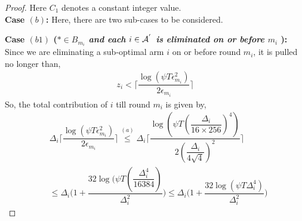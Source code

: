 \begin{proof}
Here $C_1$ denotes a constant integer value.\\


\textbf{Case $(b)$:} Here, there are two sub-cases to be considered.

\noindent
\textbf{Case $(b1)$ (\textit{${*}\in B_{m_{i}}$ and each ${i}\in \mathcal{A}^{'}$ is  eliminated on or before $m_{i}$ }): } Since we are eliminating a sub-optimal arm ${i}$ on or before round $m_{i}$, it is pulled no longer than, 
 \begin{align*}
 z_{i} < \bigg\lceil\dfrac{\log{(\psi T\epsilon_{m_{i}}^{2})}}{2\epsilon_{m_{i}}}\bigg\rceil
 \end{align*}
So, the total contribution of ${i}$  till round $m_{i}$ is given by, 
\begin{align*}
&\Delta_{i}\bigg\lceil\dfrac{\log{(\psi T\epsilon_{m_{i}}^{2})}}{2\epsilon_{m_{i}}}\bigg\rceil
\overset{(a)}{\leq}    \Delta_{i}\bigg\lceil\dfrac{\log{(\psi T(\dfrac{\Delta_{i}}{16 \times 256})^{4})}}{2(\dfrac{\Delta_{i}}{4\sqrt{4}})^{2}}\bigg\rceil \\
&\leq   \Delta_{i}\bigg(1+\dfrac{32\log{(\psi T(\dfrac{\Delta_{i}^{4}}{16384})}}{\Delta_{i}^{2}}\bigg)
\leq \Delta_{i}\bigg(1+\dfrac{32\log{(\psi T\Delta_{i}^{4})}}{\Delta_{i}^{2}}\bigg) 
\end{align*} 


\end{proof}
